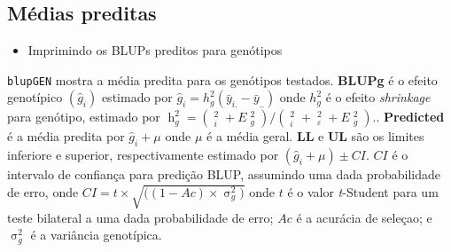 \documentclass[
]{book}
\newenvironment{Shaded}{\begin{snugshade}}{\end{snugshade}}
\newcommand{\CommentTok}[1]{\textcolor[rgb]{0.56,0.35,0.01}{\textit{#1}}}
\newcommand{\KeywordTok}[1]{\textcolor[rgb]{0.13,0.29,0.53}{\textbf{#1}}}
\newcommand{\NormalTok}[1]{#1}
\newcommand{\OperatorTok}[1]{\textcolor[rgb]{0.81,0.36,0.00}{\textbf{#1}}}
\providecommand{\tightlist}{%
  \setlength{\itemsep}{0pt}\setlength{\parskip}{0pt}}
\numberwithin{equation}{section}
\newcommand{\indt}[1]{\index{#1|ST}}
\begin{document}
\hypertarget{muxe9dias-preditas}{%
\subsection{Médias preditas}\label{muxe9dias-preditas}}

\begin{itemize}
\tightlist
\item
  Imprimindo os BLUPs preditos para genótipos
\end{itemize}

\indt{BLUP}

\begin{Shaded}
\end{Shaded}

\texttt{blupGEN} mostra a média predita para os genótipos testados. \textbf{BLUPg} é o efeito genotípico \((\hat{g}_{i})\) estimado por \(\hat{g}_{i} = h_g^2(\bar{y}_{i.}-\bar{y}_{..})\) onde \(h_g^2\) é o efeito \emph{shrinkage} para genótipo, estimado por \(\mathop h\nolimits_g^2 = (\mathop {\hat \sigma }\nolimits_i^2 + E\mathop {\hat \sigma }\nolimits_g^2 )/(\mathop {\hat \sigma }\nolimits_i^2 + \mathop {\hat \sigma }\nolimits_\varepsilon ^2 + E\mathop {\hat \sigma }\nolimits_g^2 ).\). \textbf{Predicted} é a média predita por \(\hat{g}_{i}+\mu\) onde \(\mu\) é a média geral. \textbf{LL} e \textbf{UL} são os limites inferiore e superior, respectivamente estimado por \((\hat{g}_{i}+\mu)\pm{CI}\). \(CI\) é o intervalo de confiança para predição BLUP, assumindo uma dada probabilidade de erro, onde \(CI = t\times\sqrt{((1-Ac)\times{\mathop \sigma \nolimits_g^2)}}\) onde \(t\) é o valor \emph{t}-Student para um teste bilateral a uma dada probabilidade de erro; \(Ac\) é a acurácia de seleçao; e \(\mathop \sigma \nolimits_g^2\) é a variância genotípica.
\end{document}
